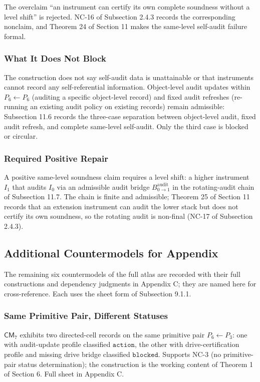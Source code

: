 \documentclass[11pt]{article}
\theoremstyle{definition}
\begin{document}
The overclaim ``an instrument can certify its own complete soundness without a level shift'' is rejected. NC-16 of Subsection 2.4.3 records the corresponding nonclaim, and Theorem 24 of Section 11 makes the same-level self-audit failure formal.

\subsubsection{What It Does Not Block}

The construction does not say self-audit data is unattainable or that instruments cannot record any self-referential information. Object-level audit updates within \(P_6\leftarrow P_6\) (auditing a specific object-level record) and fixed audit refreshes (re-running an existing audit policy on existing records) remain admissible: Subsection 11.6 records the three-case separation between object-level audit, fixed audit refresh, and complete same-level self-audit. Only the third case is blocked or circular.

\subsubsection{Required Positive Repair}

A positive same-level soundness claim requires a level shift: a higher instrument \(I_1\) that audits \(I_0\) via an admissible audit bridge \(B^{\mathrm{audit}}_{0\to 1}\) in the rotating-audit chain of Subsection 11.7. The chain is finite and admissible; Theorem 25 of Section 11 records that an extension instrument can audit the lower stack but does not certify its own soundness, so the rotating audit is non-final (NC-17 of Subsection 2.4.3).

\subsection{Additional Countermodels for Appendix}

The remaining six countermodels of the full atlas are recorded with their full constructions and dependency judgments in Appendix C; they are named here for cross-reference. Each uses the sheet form of Subsection 9.1.1.

\subsubsection{Same Primitive Pair, Different Statuses}

\(\mathsf{CM}_7\) exhibits two directed-cell records on the same primitive pair \(P_6\leftarrow P_3\): one with audit-update profile classified \(\texttt{action}\), the other with drive-certification profile and missing drive bridge classified \(\texttt{blocked}\). Supports NC-3 (no primitive-pair status determination); the construction is the working content of Theorem 1 of Section 6. Full sheet in Appendix C.
\end{document}
